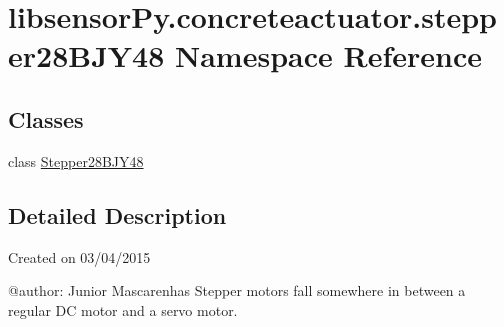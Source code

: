 \hypertarget{namespacelibsensorPy_1_1concreteactuator_1_1stepper28BJY48}{}\section{libsensor\+Py.\+concreteactuator.\+stepper28\+B\+J\+Y48 Namespace Reference}
\label{namespacelibsensorPy_1_1concreteactuator_1_1stepper28BJY48}
\subsection*{Classes}
\begin{DoxyCompactItemize}
\item 
class \hyperlink{classlibsensorPy_1_1concreteactuator_1_1stepper28BJY48_1_1Stepper28BJY48}{Stepper28\+B\+J\+Y48}
\end{DoxyCompactItemize}


\subsection{Detailed Description}
\begin{DoxyVerb}Created on 03/04/2015

@author: Junior Mascarenhas
Stepper motors fall somewhere in between a regular DC motor and a servo motor.
\end{DoxyVerb}
 
